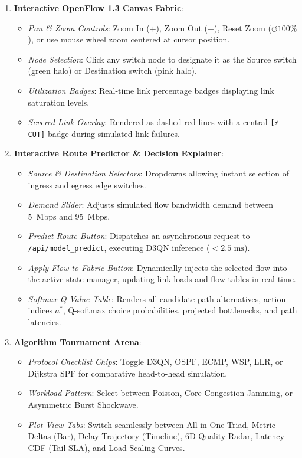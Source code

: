 \documentclass[12pt,a4paper,oneside]{report}
\begin{document}
\begin{enumerate}
    \item \textbf{Interactive OpenFlow 1.3 Canvas Fabric}:
    \begin{itemize}
        \item \textit{Pan \& Zoom Controls}: Zoom In ($+$), Zoom Out ($-$), Reset Zoom ($\circlearrowleft 100\%$), or use mouse wheel zoom centered at cursor position.
        \item \textit{Node Selection}: Click any switch node to designate it as the Source switch (green halo) or Destination switch (pink halo).
        \item \textit{Utilization Badges}: Real-time link percentage badges displaying link saturation levels.
        \item \textit{Severed Link Overlay}: Rendered as dashed red lines with a central \texttt{[⚡ CUT]} badge during simulated link failures.
    \end{itemize}
    
    \item \textbf{Interactive Route Predictor \& Decision Explainer}:
    \begin{itemize}
        \item \textit{Source \& Destination Selectors}: Dropdowns allowing instant selection of ingress and egress edge switches.
        \item \textit{Demand Slider}: Adjusts simulated flow bandwidth demand between 5~Mbps and 95~Mbps.
        \item \textit{Predict Route Button}: Dispatches an asynchronous request to \texttt{/api/model\_predict}, executing D3QN inference ($<2.5\text{ ms}$).
        \item \textit{Apply Flow to Fabric Button}: Dynamically injects the selected flow into the active state manager, updating link loads and flow tables in real-time.
        \item \textit{Softmax Q-Value Table}: Renders all candidate path alternatives, action indices $a^*$, Q-softmax choice probabilities, projected bottlenecks, and path latencies.
    \end{itemize}
    
    \item \textbf{Algorithm Tournament Arena}:
    \begin{itemize}
        \item \textit{Protocol Checklist Chips}: Toggle D3QN, OSPF, ECMP, WSP, LLR, or Dijkstra SPF for comparative head-to-head simulation.
        \item \textit{Workload Pattern}: Select between Poisson, Core Congestion Jamming, or Asymmetric Burst Shockwave.
        \item \textit{Plot View Tabs}: Switch seamlessly between All-in-One Triad, Metric Deltas (Bar), Delay Trajectory (Timeline), 6D Quality Radar, Latency CDF (Tail SLA), and Load Scaling Curves.
    \end{itemize}
    

\end{enumerate}
\end{document}
